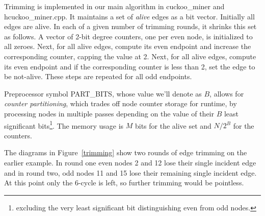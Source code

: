 \documentclass[11pt, oneside]{article}
\begin{document}
Trimming is implemented in our main algorithm in cuckoo\_miner and hcuckoo\_miner.cpp.
It maintains a set of {\em alive} edges as a bit vector. Initially all edges are alive.
In each of a given number of trimming rounds, it shrinks this set as follows.
A vector of 2-bit degree counters, one per even node, is initialized to all zeroes.
Next, for all alive edges, compute its even endpoint and increase the corresponding counter,
capping the value at 2.
Next, for all alive edges, compute its even endpoint and if the corresponding counter is less than 2,
set the edge to be not-alive.
These steps are repeated for all odd endpoints.

Preprocessor symbol PART\_BITS, whose value we'll denote as $B$,
allows for {\em counter partitioning}, which trades off node counter storage for runtime,
by processing nodes in multiple passes depending on the value of their $B$ least significant
bits\footnote{excluding the very least significant bit distinguishing even from odd nodes.}.
The memory usage is $M$ bits for the alive set and $N / 2^{B}$ for the counters.

The diagrams in Figure~\ref{trimming} show two rounds of edge trimming on the earlier example. In round one
even nodes 2 and 12 lose their single incident edge and in round two, odd nodes 11 and 15 lose
their remaining single incident edge. At this point only the 6-cycle is left, so further trimming
would be pointless.
\end{document}
